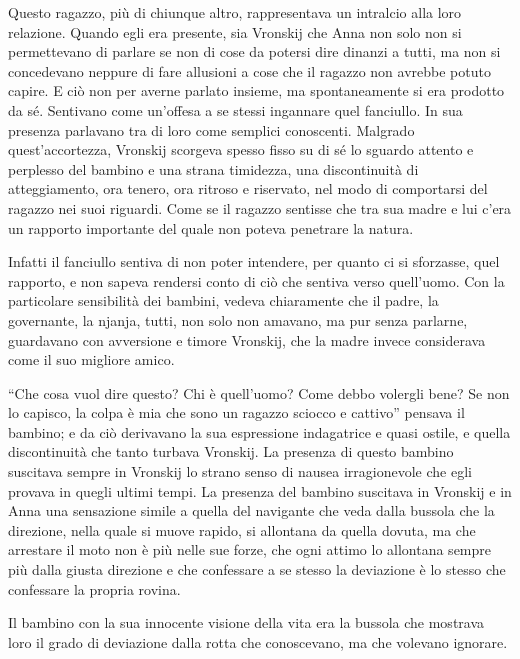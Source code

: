 Questo ragazzo, più di chiunque altro, rappresentava un intralcio alla loro relazione. Quando egli era presente, sia Vronskij che Anna non solo non si permettevano di parlare se non di cose da potersi dire dinanzi a tutti, ma non si concedevano neppure di fare allusioni a cose che il ragazzo non avrebbe potuto capire. E ciò non per averne parlato insieme, ma spontaneamente si era prodotto da sé. Sentivano come un'offesa a se stessi ingannare quel fanciullo. In sua presenza parlavano tra di loro come semplici conoscenti. Malgrado quest'accortezza, Vronskij scorgeva spesso fisso su di sé lo sguardo attento e perplesso del bambino e una strana timidezza, una discontinuità di atteggiamento, ora tenero, ora ritroso e riservato, nel modo di comportarsi del ragazzo nei suoi riguardi. Come se il ragazzo sentisse che tra sua madre e lui c'era un rapporto importante del quale non poteva penetrare la natura. 

Infatti il fanciullo sentiva di non poter intendere, per quanto ci si sforzasse, quel rapporto, e non sapeva rendersi conto di ciò che sentiva verso quell'uomo. Con la particolare sensibilità dei bambini, vedeva chiaramente che il padre, la governante, la njanja, tutti, non solo non amavano, ma pur senza parlarne, guardavano con avversione e timore Vronskij, che la madre invece considerava come il suo migliore amico. 

``Che cosa vuol dire questo? Chi è quell'uomo? Come debbo volergli bene? Se non lo capisco, la colpa è mia che sono un ragazzo sciocco e cattivo'' pensava il bambino; e da ciò derivavano la sua espressione indagatrice e quasi ostile, e quella discontinuità che tanto turbava Vronskij. La presenza di questo bambino suscitava sempre in Vronskij lo strano senso di nausea irragionevole che egli provava in quegli ultimi tempi. La presenza del bambino suscitava in Vronskij e in Anna una sensazione simile a quella del navigante che veda dalla bussola che la direzione, nella quale si muove rapido, si allontana da quella dovuta, ma che arrestare il moto non è più nelle sue forze, che ogni attimo lo allontana sempre più dalla giusta direzione e che confessare a se stesso la deviazione è lo stesso che confessare la propria rovina. 

Il bambino con la sua innocente visione della vita era la bussola che mostrava loro il grado di deviazione dalla rotta che conoscevano, ma che volevano ignorare. 

